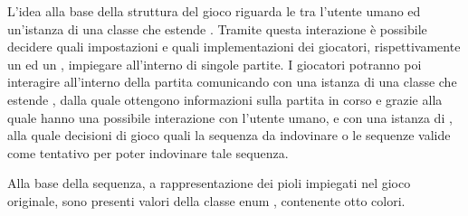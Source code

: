 \documentclass[letterpaper,10pt,italian,openany,oneside]{sphinxmanual}
\begin{document}
L’idea alla base della struttura del gioco riguarda le  tra l’utente umano ed un’istanza
di una classe che estende . Tramite questa interazione è possibile decidere quali impostazioni
e quali implementazioni dei giocatori, rispettivamente un  ed un ,
impiegare all’interno di singole partite. I giocatori potranno poi interagire all’interno della partita
comunicando con una istanza di una classe che estende , dalla quale ottengono informazioni
sulla partita in corso e grazie alla quale hanno una possibile interazione con l’utente umano, e con
una istanza di , alla quale  decisioni di gioco quali la sequenza da indovinare o le sequenze
valide come tentativo per poter indovinare tale sequenza.

Alla base della sequenza, a rappresentazione dei pioli impiegati nel gioco originale, sono presenti valori della
classe enum , contenente otto colori.
\end{document}
